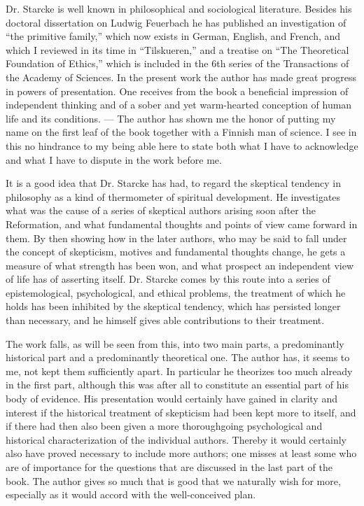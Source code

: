 \documentclass[12pt,a4paper,openany]{book}
\newcommand{\opage}[1]{\marginnote{\footnotesize\textit{[#1]}}}
\begin{document}
Dr. Starcke is well known in philosophical and sociological
literature. Besides his doctoral dissertation on Ludwig
Feuerbach he has published an investigation of ``the primitive
family,'' which now exists in German, English, and
French, and which I reviewed in its time in ``Tilskueren,''
and a treatise on ``The Theoretical Foundation of Ethics,'' which is
included in the 6th series of the Transactions of the Academy of Sciences. In
the present work the author has made great progress
in powers of presentation. One receives from the book a beneficial
impression of independent thinking and of a sober and yet
warm-hearted conception of human life and its
conditions. --- The author has shown me the honor of putting my
name on the first leaf of the book together with a Finnish
man of science. I see in this no hindrance to my being able here to
state both what I have to acknowledge and what I have
to dispute in the work before me.

It is a good idea that Dr. Starcke has had, to regard
the skeptical tendency in philosophy as a kind of thermometer
of spiritual development. He investigates what
was the cause of a series of skeptical authors arising soon after the
Reformation, and what fundamental thoughts and
points of view came forward in them. By then showing how
\opage{17}in the later authors, who may be said to fall under
the concept of skepticism, motives and fundamental thoughts change, he gets
a measure of what strength has been won, and
what prospect an independent view of life has of asserting
itself. Dr. Starcke comes by this route into
a series of epistemological, psychological, and ethical
problems, the treatment of which he holds has been inhibited by
the skeptical tendency, which has persisted longer than
necessary, and he himself gives able contributions to their
treatment.

The work falls, as will be seen from this, into two main parts,
a predominantly historical part and a predominantly theoretical one.
The author has, it seems to me, not kept them sufficiently
apart. In particular he theorizes too
much already in the first part, although this was after all to
constitute an essential part of his body of evidence. His
presentation would certainly have gained in clarity and interest
if the historical treatment of skepticism had been kept
more to itself, and if there had then also been given a
more thoroughgoing psychological and historical characterization of
the individual authors. Thereby it would certainly also have
proved necessary to include more authors; one misses at
least some who are of importance for the questions
that are discussed in the last part of the book. The author gives so
much that is good that we naturally wish for more, especially as it would
accord with the well-conceived plan.
\end{document}
